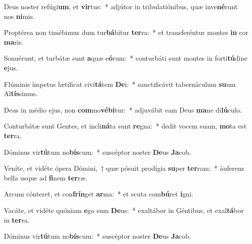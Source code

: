 \item Deus noster refúgi\textbf{um}, et \textbf{vir}tus:~* adjútor in tribulatiónibus, quæ inve\textbf{né}runt nos \textbf{ni}mis.
\item Proptérea non timébimus dum tur\textbf{bá}bitur \textbf{ter}ra:~* et transferéntur montes \textbf{in} cor \textbf{ma}ris.
\item Sonuérunt, et turbátæ sunt \textbf{a}quæ e\textbf{ó}rum:~* conturbáti sunt montes in forti\textbf{tú}dine \textbf{e}jus.
\item Flúminis ímpetus lætíficat civi\textbf{tá}tem \textbf{De}i:~* sanctificávit tabernáculum \textbf{su}um Al\textbf{tís}simus.
\item Deus in médio ejus, non \textbf{com}mo\textbf{vé}\textbf{bi}tur:~* adjuvábit eam Deus \textbf{ma}ne di\textbf{lú}culo.
\item Conturbátæ sunt Gentes, et incli\textbf{ná}ta sunt \textbf{re}gna:~* dedit vocem suam, \textbf{mo}ta est \textbf{ter}ra.
\item Dóminus vir\textbf{tú}tum no\textbf{bís}cum:~* suscéptor noster \textbf{De}us \textbf{Ja}cob.
\item Veníte, et vidéte ópera Dómini,~† quæ pósuit prodígia \textbf{su}per \textbf{ter}ram:~* áuferens bella usque ad \textbf{fi}nem \textbf{ter}ræ.
\item Arcum cónteret, et con\textbf{frín}get \textbf{ar}ma:~* et scuta com\textbf{bú}ret \textbf{i}gni.
\item Vacáte, et vidéte quóniam \textbf{e}go sum \textbf{De}us:~* exaltábor in Géntibus, et exal\textbf{tá}bor in \textbf{ter}ra.
\item Dóminus vir\textbf{tú}tum no\textbf{bís}cum:~* suscéptor noster \textbf{De}us \textbf{Ja}cob.
